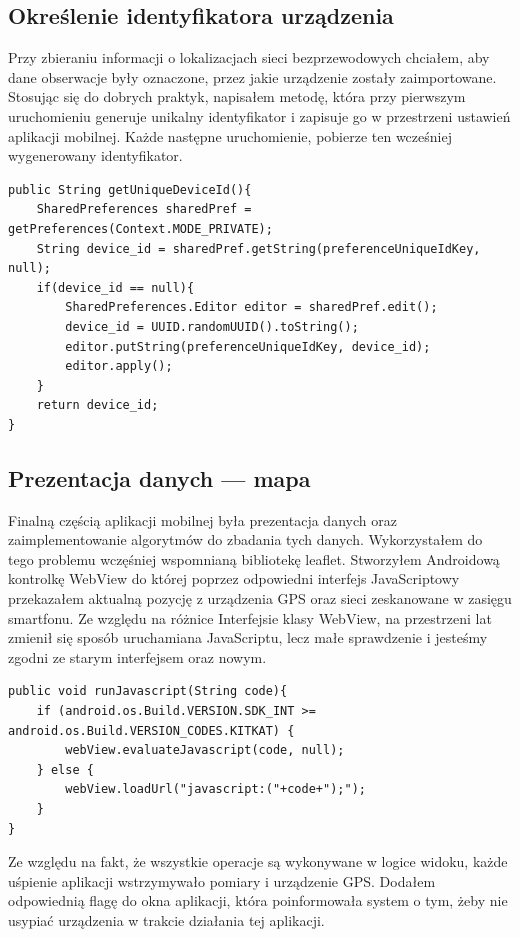 \subsection{Określenie identyfikatora urządzenia}
Przy zbieraniu informacji o lokalizacjach sieci bezprzewodowych chciałem, aby dane obserwacje były oznaczone, przez jakie urządzenie zostały zaimportowane. Stosując się do dobrych praktyk, napisałem metodę, która przy pierwszym uruchomieniu generuje unikalny identyfikator i zapisuje go w przestrzeni ustawień aplikacji mobilnej. Każde następne uruchomienie, pobierze ten wcześniej wygenerowany identyfikator.
\begin{verbatim}
public String getUniqueDeviceId(){
    SharedPreferences sharedPref = getPreferences(Context.MODE_PRIVATE);
    String device_id = sharedPref.getString(preferenceUniqueIdKey, null);
    if(device_id == null){
        SharedPreferences.Editor editor = sharedPref.edit();
        device_id = UUID.randomUUID().toString();
        editor.putString(preferenceUniqueIdKey, device_id);
        editor.apply();
    }
    return device_id;
}
\end{verbatim}

\subsection{Prezentacja danych — mapa}
Finalną częścią aplikacji mobilnej była prezentacja danych oraz zaimplementowanie algorytmów do zbadania tych danych. Wykorzystałem do tego problemu wczęśniej wspomnianą bibliotekę leaflet. Stworzyłem Androidową kontrolkę WebView do której poprzez odpowiedni interfejs JavaScriptowy przekazałem aktualną pozycję z urządzenia GPS oraz sieci zeskanowane w zasięgu smartfonu. Ze względu na różnice Interfejsie klasy WebView, na przestrzeni lat zmienił się sposób uruchamiana JavaScriptu, lecz małe sprawdzenie i jesteśmy zgodni ze starym interfejsem oraz nowym.

\begin{verbatim}
public void runJavascript(String code){
    if (android.os.Build.VERSION.SDK_INT >= android.os.Build.VERSION_CODES.KITKAT) {
        webView.evaluateJavascript(code, null);
    } else {
        webView.loadUrl("javascript:("+code+");");
    }
}
\end{verbatim}

Ze względu na fakt, że wszystkie operacje są wykonywane w logice widoku, każde uśpienie aplikacji wstrzymywało pomiary i urządzenie GPS. Dodałem odpowiednią flagę do okna aplikacji, która poinformowała system o tym, żeby nie usypiać urządzenia w trakcie działania tej aplikacji.

